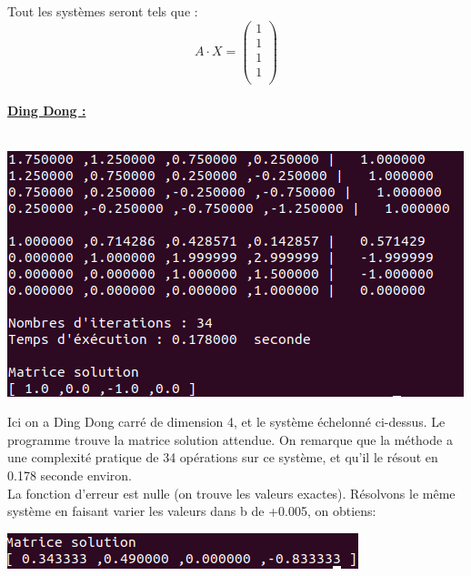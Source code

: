 \documentclass[a4paper]{article}
\begin{document}
Tout les systèmes seront tels que :\\
\[
A \cdot X = 
\begin{pmatrix} 
1  \\ 
1  \\ 
1  \\ 
1  \\
\end{pmatrix}
\]
\\
\textbf{\underline{\large{Ding Dong :}}}
\\
\\
\begin{center}
	\includegraphics[scale=0.5]{./img/gauss/TestDingDong.png} \\
\end{center}

Ici on a Ding Dong carré de dimension 4, et le système échelonné ci-dessus.
Le programme trouve la matrice solution attendue.
On remarque que la méthode a une complexité pratique de 34 opérations sur ce système, et qu'il le résout en 0.178 seconde environ.
\\
La fonction d'erreur est nulle (on trouve les valeurs exactes).
Résolvons le même système en faisant varier les valeurs dans b de +0.005, on obtiens:
\\
\begin{center}
	\includegraphics[scale=0.5]{./img/gauss/dingdong005.png} \\
\end{center}
\end{document}
